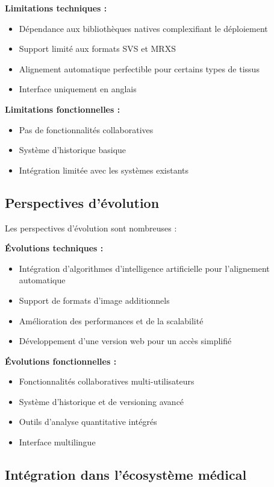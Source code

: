 \documentclass[11pt,a4paper]{report}
\begin{document}
\textbf{Limitations techniques :}
\begin{itemize}
\item Dépendance aux bibliothèques natives complexifiant le déploiement
\item Support limité aux formats SVS et MRXS
\item Alignement automatique perfectible pour certains types de tissus
\item Interface uniquement en anglais
\end{itemize}

\textbf{Limitations fonctionnelles :}
\begin{itemize}
\item Pas de fonctionnalités collaboratives
\item Système d'historique basique
\item Intégration limitée avec les systèmes existants
\end{itemize}

\subsection{Perspectives d'évolution}

Les perspectives d'évolution sont nombreuses :

\textbf{Évolutions techniques :}
\begin{itemize}
\item Intégration d'algorithmes d'intelligence artificielle pour l'alignement automatique
\item Support de formats d'image additionnels
\item Amélioration des performances et de la scalabilité
\item Développement d'une version web pour un accès simplifié
\end{itemize}

\textbf{Évolutions fonctionnelles :}
\begin{itemize}
\item Fonctionnalités collaboratives multi-utilisateurs
\item Système d'historique et de versioning avancé
\item Outils d'analyse quantitative intégrés
\item Interface multilingue
\end{itemize}

\subsection{Intégration dans l'écosystème médical}
\end{document}
